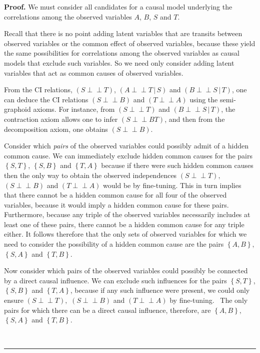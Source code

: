\documentclass[letterpaper,onecolumn,nofootinbib]{revtex4}
\newenvironment{proof}[1][Proof]{\noindent\textbf{#1.} }{\ \rule{0.5em}{0.5em}}
\def\indep{\perp\!\!\!\!\perp}
\begin{document}
\begin{proof}
We must consider all candidates for a causal
model underlying the correlations among the observed variables $A$, $B$, $S$ and
$T.$

Recall that there is no point adding latent variables that are transits
between observed variables or the common effect of observed variables, because
these yield the same possibilities for correlations among the observed variables as causal models that
exclude such variables. 
So we need only
consider adding latent variables that act as common causes of observed variables.

From the CI relations, $\left( S\indep T\right)$, $\left( A\indep T\,|\,S\right) $ and $\left( B\indep S\,|\,T\right)$, one can deduce the CI relations $\left(S\indep B\right)$ and $\left(T\indep A\right)$ using the semi-graphoid axioms. For instance, from $\left( S\indep T\right)$ and $\left( B\indep S\,|\,T\right)$, the contraction axiom allows one to infer $\left(S \indep BT\right)$, and then from the decomposition axiom, one obtains $\left( S\indep B\right)$.  

Consider which {\em pairs} of the observed variables could possibly
admit of a hidden common cause.  We can immediately exclude hidden common causes for the pairs $\left\{  S,T\right\}  $,
$\left\{  S,B\right\}  $ and $\left\{  T,A\right\}  $ because if there were such hidden common causes then the only way to obtain the observed
independences $\left(S\indep T\right),$ $\left(S\indep B\right)$ and $\left(T\indep A\right)$ would be by fine-tuning.  This in turn implies that there cannot be a hidden common cause for all four of the observed variables, because it would imply a hidden common cause for these pairs.  Furthermore, because any triple of the observed variables necessarily includes at least one of these pairs, there cannot be a hidden common cause for any triple either.
It follows therefore that the only sets of observed variables for which we need to consider the possibility of a hidden common cause are the pairs $\left\{A,B\right\},$ $\left\{  S,A\right\}  $ and $\left\{  T,B\right\}$.

Now consider which pairs of the observed variables could possibly be connected by a direct causal influence.  We can exclude such
influences for the pairs $\left\{S,T\right\}$,
$\left\{S,B\right\}$ and $\left\{T,A\right\}$, because if any such influence were present, we could
only ensure $\left(S\indep T\right),$ $\left(S\indep B\right)$ and $\left(T\indep A\right)$ by fine-tuning. \ The only
pairs for which there can be a direct causal influence, therefore, are $\left\{A,B\right\},$ $\left\{  S,A\right\}  $ and $\left\{  T,B\right\}.$


\end{proof}
\end{document}
